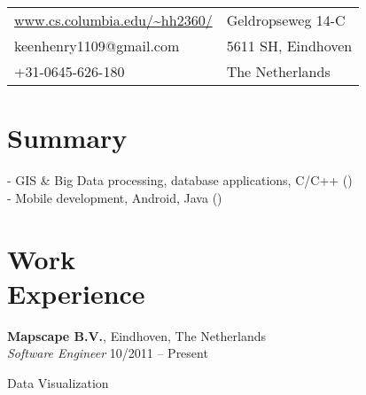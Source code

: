 \documentclass[margin,line]{resume}
\begin{document}
\begin{resume}

      \begin{tabular}{@{}p{6cm}p{8.5cm}}
      \url{www.cs.columbia.edu/~hh2360/}  &  Geldropseweg 14-C \\
      keenhenry1109@gmail.com             &  5611 SH, Eindhoven \\
      +31-0645-626-180	& The Netherlands \\
      \end{tabular}

 
    \section{\mysidestyle Summary}
      - GIS \& Big Data processing, database applications, C/C++ () \\
      - Mobile development, Android, Java () \\
      
    \section{\mysidestyle Work \\ Experience}

    \textbf{Mapscape B.V.}, Eindhoven, The Netherlands \\
    \textsl{Software Engineer} \hfill 10/2011 -- Present \vspace{-3mm}\\\vspace{-1mm}%
      \begin{list2}
      \item Data Visualization  %
      \end{list2}


\end{resume}
\end{document}
